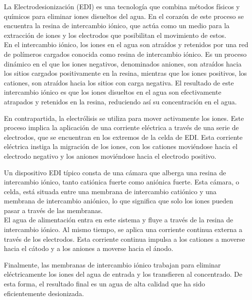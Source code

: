 La Electrodesionización (EDI) es una tecnología que combina métodos físicos y químicos para eliminar iones disueltos
del agua. En el corazón de este proceso se encuentra la resina de intercambio iónico, que actúa como un medio para la
extracción de iones y los electrodos que posibilitan el movimiento de estos. \\

En el intercambio iónico, los iones en el agua son atraídos y retenidos por una red de polímeros cargados conocida como resina de intercambio iónico. Es un proceso dinámico en el que los iones negativos, denominados aniones, son atraídos hacia los sitios cargados positivamente en la resina, mientras que los iones positivos, los cationes, son atraídos hacia los sitios con carga negativa. El resultado de este intercambio iónico es que los iones disueltos en el agua son efectivamente atrapados y retenidos en la resina, reduciendo así su concentración en el agua.

En contrapartida, la electrólisis se utiliza para mover activamente los iones. Este proceso implica la aplicación de una corriente eléctrica a través de una serie de electrodos, que se encuentran en los extremos de la celda de EDI. Esta corriente eléctrica instiga la migración de los iones, con los cationes moviéndose hacia el electrodo negativo y los aniones moviéndose hacia el electrodo positivo.

Un dispositivo EDI típico consta de una cámara que alberga una resina de intercambio iónico, tanto catiónica fuerte como aniónica fuerte. Esta cámara, o celda, está situada entre una membrana de intercambio catiónico y una membrana de intercambio aniónico, lo que significa que solo los iones pueden pasar a través de las membranas. \\

El agua de alimentación entra en este sistema y fluye a través de la resina de intercambio iónico. Al mismo tiempo, se aplica una corriente continua externa a través de los electrodos. Esta corriente continua impulsa a los cationes a moverse hacia el cátodo y a los aniones a moverse hacia el ánodo.

Finalmente, las membranas de intercambio iónico trabajan para eliminar eléctricamente los iones del agua de entrada y los transfieren al concentrado. De esta forma, el resultado final es un agua de alta calidad que ha sido eficientemente desionizada.


